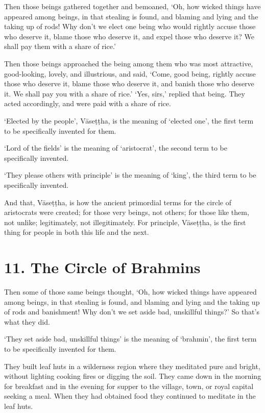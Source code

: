 \documentclass[12pt,openany]{book}%
\begin{document}
Then those beings gathered together and bemoaned, ‘Oh, how wicked things have appeared among beings, in that stealing is found, and blaming and lying and the taking up of rods! Why don’t we elect one being who would rightly accuse those who deserve it, blame those who deserve it, and expel those who deserve it? We shall pay them with a share of rice.’ 

Then those beings approached the being among them who was most attractive, good-looking, lovely, and illustrious, and said, ‘Come, good being, rightly accuse those who deserve it, blame those who deserve it, and banish those who deserve it. We shall pay you with a share of rice.’ ‘Yes, sirs,’ replied that being. They acted accordingly, and were paid with a share of rice. 

‘Elected by the people’, \textsanskrit{Vāseṭṭha}, is the meaning of ‘elected one’, the first term to be specifically invented for them. 

‘Lord of the fields’ is the meaning of ‘aristocrat’, the second term to be specifically invented. 

‘They please others with principle’ is the meaning of ‘king’, the third term to be specifically invented. 

And that, \textsanskrit{Vāseṭṭha}, is how the ancient primordial terms for the circle of aristocrats were created; for those very beings, not others; for those like them, not unlike; legitimately, not illegitimately. For principle, \textsanskrit{Vāseṭṭha}, is the first thing for people in both this life and the next. 

\section*{11. The Circle of Brahmins }

Then some of those same beings thought, ‘Oh, how wicked things have appeared among beings, in that stealing is found, and blaming and lying and the taking up of rods and banishment! Why don’t we set aside bad, unskillful things?’ So that’s what they did. 

‘They set aside bad, unskillful things’ is the meaning of ‘brahmin’, the first term to be specifically invented for them. 

They built leaf huts in a wilderness region where they meditated pure and bright, without lighting cooking fires or digging the soil. They came down in the morning for breakfast and in the evening for supper to the village, town, or royal capital seeking a meal. When they had obtained food they continued to meditate in the leaf huts. 
\end{document}
